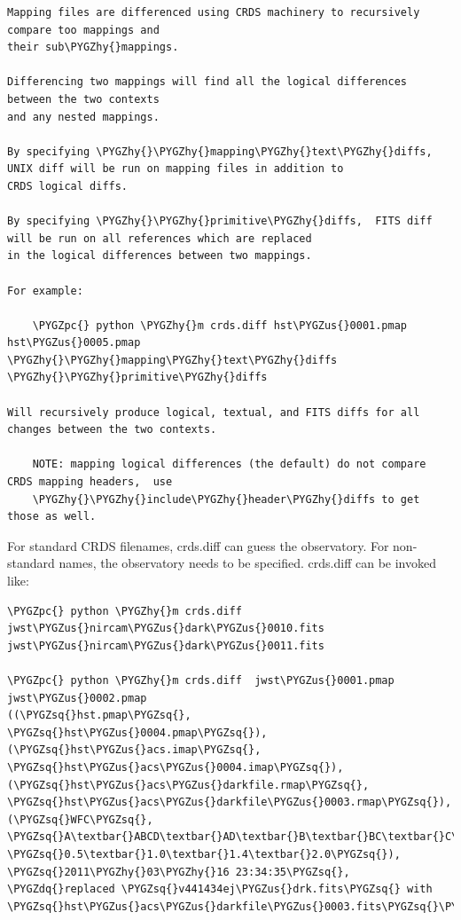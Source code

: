 \documentclass[letterpaper,10pt,english]{sphinxmanual}
\def\PYGZus{\char`\_}
\def\PYGZpc{\char`\%}
\def\PYGZhy{\char`\-}
\def\PYGZsq{\char`\'}
\def\PYGZdq{\char`\"}
\renewcommand\PYGZsq{\textquotesingle}
\begin{document}
\begin{Verbatim}[commandchars=\\\{\}]
Mapping files are differenced using CRDS machinery to recursively compare too mappings and
their sub\PYGZhy{}mappings.

Differencing two mappings will find all the logical differences between the two contexts
and any nested mappings.

By specifying \PYGZhy{}\PYGZhy{}mapping\PYGZhy{}text\PYGZhy{}diffs,  UNIX diff will be run on mapping files in addition to
CRDS logical diffs.

By specifying \PYGZhy{}\PYGZhy{}primitive\PYGZhy{}diffs,  FITS diff will be run on all references which are replaced
in the logical differences between two mappings.

For example:

    \PYGZpc{} python \PYGZhy{}m crds.diff hst\PYGZus{}0001.pmap  hst\PYGZus{}0005.pmap  \PYGZhy{}\PYGZhy{}mapping\PYGZhy{}text\PYGZhy{}diffs \PYGZhy{}\PYGZhy{}primitive\PYGZhy{}diffs

Will recursively produce logical, textual, and FITS diffs for all changes between the two contexts.

    NOTE: mapping logical differences (the default) do not compare CRDS mapping headers,  use
    \PYGZhy{}\PYGZhy{}include\PYGZhy{}header\PYGZhy{}diffs to get those as well.
\end{Verbatim}

For standard CRDS filenames,  crds.diff can guess the observatory.   For
non-standard names,  the observatory needs to be specified.  crds.diff can be
invoked like:

\begin{Verbatim}[commandchars=\\\{\}]
\PYGZpc{} python \PYGZhy{}m crds.diff   jwst\PYGZus{}nircam\PYGZus{}dark\PYGZus{}0010.fits  jwst\PYGZus{}nircam\PYGZus{}dark\PYGZus{}0011.fits

\PYGZpc{} python \PYGZhy{}m crds.diff  jwst\PYGZus{}0001.pmap   jwst\PYGZus{}0002.pmap
((\PYGZsq{}hst.pmap\PYGZsq{}, \PYGZsq{}hst\PYGZus{}0004.pmap\PYGZsq{}), (\PYGZsq{}hst\PYGZus{}acs.imap\PYGZsq{}, \PYGZsq{}hst\PYGZus{}acs\PYGZus{}0004.imap\PYGZsq{}), (\PYGZsq{}hst\PYGZus{}acs\PYGZus{}darkfile.rmap\PYGZsq{}, \PYGZsq{}hst\PYGZus{}acs\PYGZus{}darkfile\PYGZus{}0003.rmap\PYGZsq{}), (\PYGZsq{}WFC\PYGZsq{}, \PYGZsq{}A\textbar{}ABCD\textbar{}AD\textbar{}B\textbar{}BC\textbar{}C\textbar{}D\PYGZsq{}, \PYGZsq{}0.5\textbar{}1.0\textbar{}1.4\textbar{}2.0\PYGZsq{}), \PYGZsq{}2011\PYGZhy{}03\PYGZhy{}16 23:34:35\PYGZsq{}, \PYGZdq{}replaced \PYGZsq{}v441434ej\PYGZus{}drk.fits\PYGZsq{} with \PYGZsq{}hst\PYGZus{}acs\PYGZus{}darkfile\PYGZus{}0003.fits\PYGZsq{}\PYGZdq{})
\end{Verbatim}
\end{document}
